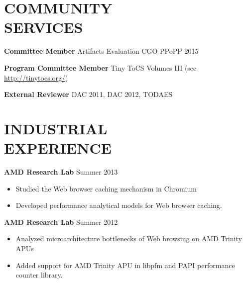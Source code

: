 \documentclass[margin, 9pt]{res} %
\begin{document}
\begin{resume}

\section{COMMUNITY\\ SERVICES}

{\large\textbf{Committee Member}} Artifacts Evaluation CGO-PPoPP 2015\par
{\large\textbf{Program Committee Member}} Tiny ToCS Volumes III (see \url{http://tinytocs.org/})\par
{\large\textbf{External Reviewer}} DAC 2011, DAC 2012, TODAES


\section{INDUSTRIAL\\ EXPERIENCE} 

{\large\textbf{AMD Research Lab}} \hfill{Summer 2013}\\
\vspace*{-10pt}
\begin{itemize}[leftmargin=*] \itemsep -3pt
\vspace*{-5pt}
	\item Studied the Web browser caching mechanism in Chromium
	\item Developed performance analytical models for Web browser caching.
\end{itemize}

\medskip
{\large\textbf{AMD Research Lab}} \hfill{Summer 2012}\\
\vspace*{-10pt}
\begin{itemize}[leftmargin=*] \itemsep -3pt
\vspace*{-5pt}
	\item Analyzed microarchitecture bottlenecks of Web browsing on AMD Trinity APUs
	\item Added support for AMD Trinity APU in libpfm and PAPI performance counter library.
\end{itemize}


\end{resume}
\end{document}
